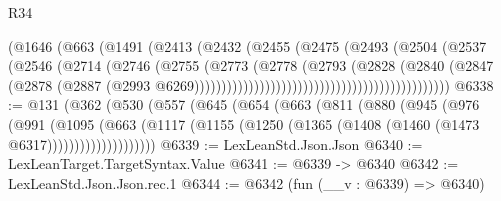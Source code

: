 \begin{lexlean}{R34}
\begin{coremodule}
                                                    (@1646
                                                      (@663
                                                        (@1491
                                                          (@2413
                                                            (@2432
                                                              (@2455
                                                                (@2475
                                                                  (@2493
                                                                    (@2504
                                                                      (@2537
                                                                        (@2546
                                                                          (@2714
                                                                            (@2746
                                                                              (@2755
                                                                                (@2773
                                                                                  (@2778
                                                                                    (@2793
                                                                                      (@2828
                                                                                        (@2840
                                                                                          (@2847
                                                                                            (@2878
                                                                                              (@2887
                                                                                                (@2993
                                                                                                  @6269)))))))))))))))))))))))))))))))))))))))))))))))
@6338 := @131
    (@362
      (@530
        (@557
          (@645
            (@654
              (@663
                (@811
                  (@880
                    (@945
                      (@976
                        (@991
                          (@1095
                            (@663
                              (@1117
                                (@1155 (@1250 (@1365 (@1408 (@1460 (@1473 @6317))))))))))))))))))))
@6339 := LexLeanStd.Json.Json
@6340 := LexLeanTarget.TargetSyntax.Value
@6341 := @6339 -> @6340
@6342 := LexLeanStd.Json.Json.rec.{1}
@6344 := @6342 (fun (__v : @6339) => @6340)

\end{coremodule}
\end{lexlean}
